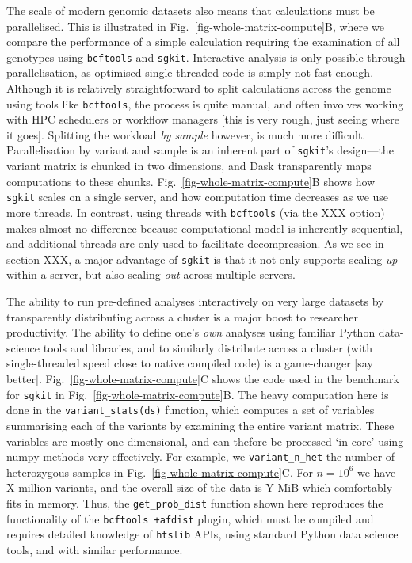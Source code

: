 \documentclass[a4paper,num-refs]{oup-contemporary}
\newcommand{\toolname}[1]{\texttt{#1}}
\begin{document}
The scale of modern genomic datasets also means that calculations must
be parallelised. This is illustrated in Fig.~\ref{fig-whole-matrix-compute}B,
where we compare the performance of a simple calculation requiring
the examination of all genotypes using \toolname{bcftools}
and \texttt{sgkit}. Interactive analysis is only possible through
parallelisation, as optimised single-threaded code
is simply not fast enough.
Although it is relatively straightforward to split calculations across
the genome using tools like \toolname{bcftools}, the process
is quite manual, and often involves working with HPC schedulers
or workflow managers [this is very rough, just seeing where it goes].
Splitting the workload \emph{by sample} however, is much more
difficult. Parallelisation by variant and sample is an inherent
part of \texttt{sgkit}'s design---the variant matrix is chunked
in two dimensions, and Dask transparently maps computations to these
chunks.
Fig.~\ref{fig-whole-matrix-compute}B shows how \texttt{sgkit} scales
on a single server, and how computation time decreases as we use
more threads. In contrast, using threads with
\toolname{bcftools} (via the XXX option) makes almost no difference
because computational model is inherently sequential, and additional threads
are only used to facilitate decompression.
As we see in section XXX,
a major advantage of \texttt{sgkit} is that it not only supports
scaling \emph{up} within a server, but also scaling \emph{out}
across multiple servers.

The ability to
run pre-defined analyses interactively on very large datasets by
transparently distributing across a cluster is a major boost to
researcher productivity. The ability to define one's \emph{own}
analyses using familiar Python data-science tools and libraries,
and to similarly distribute across a cluster (with single-threaded
speed close to native compiled code) is a game-changer [say better].
Fig.~\ref{fig-whole-matrix-compute}C shows the code used in the benchmark
for \toolname{sgkit} in Fig.~\ref{fig-whole-matrix-compute}B. The heavy
computation here is done in the \texttt{variant\_stats(ds)} function,
which computes a set of variables summarising each of the variants
by examining the entire variant matrix.
These variables are mostly one-dimensional, and can thefore
be processed `in-core' using numpy methods very effectively.
For example, we \texttt{variant\_n\_het} the number of heterozygous samples
in Fig.~\ref{fig-whole-matrix-compute}C. For $n=10^6$ we have X million
variants, and the overall size of the data is Y MiB which
comfortably fits in memory. Thus, the
\texttt{get\_prob\_dist} function shown here reproduces the functionality
of the \toolname{bcftools +afdist} plugin, which must be compiled and
requires detailed knowledge of \toolname{htslib} APIs, using standard
Python data science tools, and with similar performance.
\end{document}
